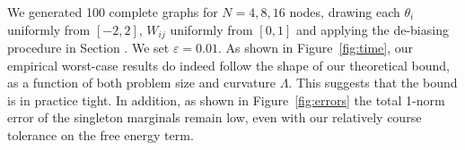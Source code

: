 \documentclass[english]{article}
\newcommand{\+}[1]{\ensuremath{\boldsymbol{\mathrm{#1}}}}
\begin{document}
We generated 100 complete graphs for $N = 4,8,16$ nodes, drawing each $\theta_i$ uniformly from $[-2,2]$, $W_{ij}$ uniformly from $[0, 1]$ and applying the de-biasing procedure in Section . We set $\varepsilon = 0.01$. As shown in Figure~\ref{fig:time}, our empirical worst-case results do indeed follow the shape of our theoretical bound, as a function of both problem size and curvature $\Lambda$. This suggests that the bound is in practice tight. In addition, as shown in Figure~\ref{fig:errors} the total 1-norm error of the singleton marginals remain low, even with our relatively course tolerance on the free energy term.
\end{document}
